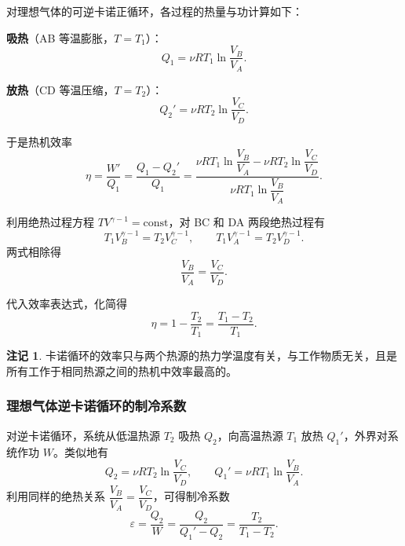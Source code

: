 \documentclass[UTF8]{ctexart}
\theoremstyle{definition}
\newtheorem{remark}{注记}
\begin{document}
对理想气体的可逆卡诺正循环，各过程的热量与功计算如下：

\textbf{吸热}（AB 等温膨胀，$T=T_1$）：
\begin{equation}
Q_1 = \nu RT_1\ln\frac{V_B}{V_A}.
\end{equation}

\textbf{放热}（CD 等温压缩，$T=T_2$）：
\begin{equation}
Q_2' = \nu RT_2\ln\frac{V_C}{V_D}.
\end{equation}

于是热机效率
\begin{equation}
\eta = \frac{W'}{Q_1} = \frac{Q_1 - Q_2'}{Q_1}
= \frac{\nu RT_1\ln\dfrac{V_B}{V_A} - \nu RT_2\ln\dfrac{V_C}{V_D}}{\nu RT_1\ln\dfrac{V_B}{V_A}}.
\end{equation}

利用绝热过程方程 $TV^{\gamma-1}=\text{const}$，对 BC 和 DA 两段绝热过程有
\begin{equation}
T_1 V_B^{\gamma-1} = T_2 V_C^{\gamma-1},\qquad
T_1 V_A^{\gamma-1} = T_2 V_D^{\gamma-1}.
\end{equation}
两式相除得
\begin{equation}
\frac{V_B}{V_A} = \frac{V_C}{V_D}.
\end{equation}

代入效率表达式，化简得
\begin{equation}
\boxed{\eta = 1 - \frac{T_2}{T_1} = \frac{T_1 - T_2}{T_1}}.
\end{equation}

\begin{remark}
卡诺循环的效率只与两个热源的热力学温度有关，与工作物质无关，且是所有工作于相同热源之间的热机中效率最高的。
\end{remark}

\subsubsection*{理想气体逆卡诺循环的制冷系数}

对逆卡诺循环，系统从低温热源 $T_2$ 吸热 $Q_2$，向高温热源 $T_1$ 放热 $Q_1'$，外界对系统作功 $W$。类似地有
\begin{equation}
Q_2 = \nu RT_2\ln\frac{V_C}{V_D},\qquad
Q_1' = \nu RT_1\ln\frac{V_B}{V_A}.
\end{equation}
利用同样的绝热关系 $\dfrac{V_B}{V_A}=\dfrac{V_C}{V_D}$，可得制冷系数
\begin{equation}
\boxed{\varepsilon = \frac{Q_2}{W} = \frac{Q_2}{Q_1'-Q_2} = \frac{T_2}{T_1-T_2}}.
\end{equation}
\end{document}
